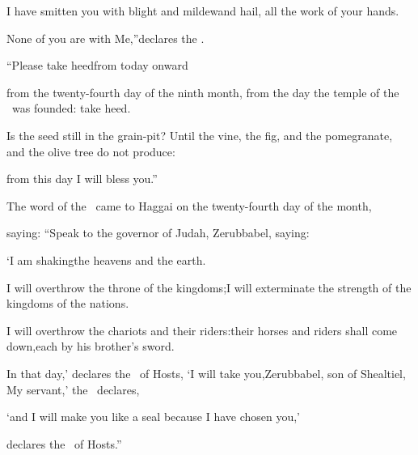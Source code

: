 \begin{inparaenum}
  \pa{} I have smitten you with blight and mildew\pa{}and hail, all the work of your hands.%

  \pa{}None of you are with Me,''\pa{}declares the \lord.%

  \pa{} ``Please take heed\pa{}from today onward%

  \pa{}from the twenty-fourth day of the ninth month, from the day the temple of the \lord\ was founded: take heed.%

  \pa{} Is the seed%
  still in the grain-pit?%
  \pa{}Until the vine, the fig, and the pomegranate,%
  \pa{}and the olive tree do not produce:%

  \pa{}from this day I will bless you.''%

  \pb{} The word of the \lord\ came to Haggai on the twenty-fourth day of the month,%

  \pa{}saying:  ``Speak to the governor of Judah, Zerubbabel, saying:%

  \pc{}`I am shaking\pa{}the heavens and the earth.%

  \pb{} I will overthrow the throne of the kingdoms;\pa{}I will exterminate the strength of the kingdoms%
  of the nations.%

  \pc{}I will overthrow the chariots and their riders:\pa{}their horses and riders shall come down,\pa{}each by his brother's sword.%

  \pc{} In that day,' declares the \lord\ of Hosts, `I will take you,\pa{}Zerubbabel, son of Shealtiel, My servant,' the \lord\ declares,%

  \pc{}`and I will make you like a seal%
  \pa{}because I have chosen you,'%

  \pd{}declares the \lord\ of Hosts.''%
\end{inparaenum}
